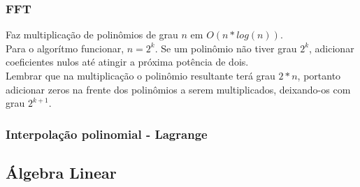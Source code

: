 \divisor

\subsubsection{FFT}
Faz multiplica\c{c}\~{a}o de polin\^{o}mios de grau $n$ em $O(n*log(n))$.\\
Para o algor\'{i}tmo funcionar, $n=2^k$. Se um polin\^{o}mio n\~{a}o tiver grau $2^k$, adicionar coeficientes nulos at\'{e} atingir a pr\'{o}xima pot\^{e}ncia de dois.\\
Lembrar que na multiplica\c{c}\~{a}o o polin\^{o}mio resultante ter\'{a} grau $2*n$, portanto adicionar zeros na frente dos polin\^{o}mios a serem multiplicados, deixando-os com grau $2^{k+1}$.

\divisor

\subsubsection{Interpola\c{c}\~{a}o polinomial - Lagrange}


\subsection{Álgebra Linear}

